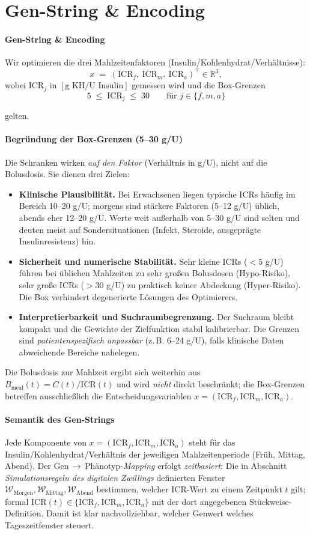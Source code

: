 \documentclass[ngerman,a4paper,12pt,pdftex]{article}
\newcommand{\ICR}{\mathrm{ICR}}
\newcommand{\ICRf}{\mathrm{ICR}_f}
\newcommand{\ICRm}{\mathrm{ICR}_m}
\newcommand{\ICRa}{\mathrm{ICR}_a}
\newcommand{\IKRtxt}{Insulin\-/Kohlenhydrat\-/Ver\-h\"altnis}
\newcommand{\IKRtxtpl}{Insulin\-/Kohlenhydrat\-/Ver\-h\"altnis\-se}
\begin{document}
\section{Gen-String \& Encoding}

\paragraph{Gen-String \& Encoding}
Wir optimieren die drei Mahlzeitenfaktoren (\IKRtxtpl):
\[
x \;=\; (\ICRf,\ \ICRm,\ \ICRa)^\top \in \mathbb{R}^3,
\]
wobei \(\mathrm{ICR}_j\) in \([\text{g KH} / \text{U Insulin}]\) gemessen wird und die Box-Grenzen
\[
5 \;\le\; \mathrm{ICR}_j \;\le\; 30 \qquad \text{für } j \in \{f,m,a\}
\]

gelten.

\paragraph{Begründung der Box-Grenzen (5--30 g/U)}
Die Schranken wirken \emph{auf den Faktor} (Verhältnis in g/U), nicht auf die Bolusdosis. Sie dienen drei Zielen:
\begin{itemize}
  \item \textbf{Klinische Plausibilität.} Bei Erwachsenen liegen typische ICRs häufig im Bereich 10--20 g/U; morgens sind stärkere Faktoren (5--12 g/U) üblich, abends eher 12--20 g/U. Werte weit außerhalb von 5--30 g/U sind selten und deuten meist auf Sondersituationen (Infekt, Steroide, ausgeprägte Insulinresistenz) hin.
  \item \textbf{Sicherheit und numerische Stabilität.} Sehr kleine ICRs (\(<5\) g/U) führen bei üblichen Mahlzeiten zu sehr großen Bolusdosen (Hypo-Risiko), sehr große ICRs (\(>30\) g/U) zu praktisch keiner Abdeckung (Hyper-Risiko). Die Box verhindert degenerierte Lösungen des Optimierers.
  \item \textbf{Interpretierbarkeit und Suchraumbegrenzung.} Der Suchraum bleibt kompakt und die Gewichte der Zielfunktion stabil kalibrierbar. Die Grenzen sind \emph{patientenspezifisch anpassbar} (z.\,B. 6--24 g/U), falls klinische Daten abweichende Bereiche nahelegen.
\end{itemize}
Die Bolusdosis zur Mahlzeit ergibt sich weiterhin aus \(B_{\mathrm{meal}}(t)=C(t)/\ICR(t)\) und wird \emph{nicht} direkt beschränkt; die Box-Grenzen betreffen ausschließlich die Entscheidungsvariablen \(x=(\ICRf,\ICRm,\ICRa)\).


\paragraph{Semantik des Gen-Strings}
Jede Komponente von \(x=(\ICRf,\ICRm,\ICRa)\) steht für das \IKRtxt{} der jeweiligen Mahlzeitenperiode (Früh, Mittag, Abend). Der Gen\,\(\to\)\,Phänotyp-\emph{Mapping} erfolgt \emph{zeitbasiert}: Die in Abschnitt \emph{Simulationsregeln des digitalen Zwillings} definierten Fenster \(\mathcal W_{\mathrm{Morgen}},\mathcal W_{\mathrm{Mittag}},\mathcal W_{\mathrm{Abend}}\) bestimmen, welcher ICR-Wert zu einem Zeitpunkt \(t\) gilt; formal \(\ICR(t)\in\{\ICRf,\ICRm,\ICRa\}\) mit der dort angegebenen Stückweise-Definition. Damit ist klar nachvollziehbar, welcher Genwert welches Tageszeitfenster steuert.
\end{document}
